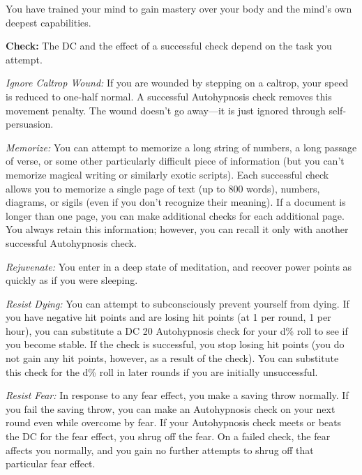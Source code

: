 You have trained your mind to gain mastery over your body and the mind's own deepest capabilities.

\textbf{Check:} The DC and the effect of a successful check depend on the task you attempt.


\textit{Ignore Caltrop Wound:} If you are wounded by stepping on a caltrop, your speed is reduced to one-half normal. A successful Autohypnosis check removes this movement penalty. The wound doesn't go away---it is just ignored through self-persuasion.

\textit{Memorize:} You can attempt to memorize a long string of numbers, a long passage of verse, or some other particularly difficult piece of information (but you can't memorize magical writing or similarly exotic scripts). Each successful check allows you to memorize a single page of text (up to 800 words), numbers, diagrams, or sigils (even if you don't recognize their meaning). If a document is longer than one page, you can make additional checks for each additional page. You always retain this information; however, you can recall it only with another successful Autohypnosis check.

\textit{Rejuvenate:} You enter in a deep state of meditation, and recover power points as quickly as if you were sleeping.

\textit{Resist Dying:} You can attempt to subconsciously prevent yourself from dying. If you have negative hit points and are losing hit points (at 1 per round, 1 per hour), you can substitute a DC 20 Autohypnosis check for your d\% roll to see if you become stable. If the check is successful, you stop losing hit points (you do not gain any hit points, however, as a result of the check). You can substitute this check for the d\% roll in later rounds if you are initially unsuccessful.

\textit{Resist Fear:} In response to any fear effect, you make a saving throw normally. If you fail the saving throw, you can make an Autohypnosis check on your next round even while overcome by fear. If your Autohypnosis check meets or beats the DC for the fear effect, you shrug off the fear. On a failed check, the fear affects you normally, and you gain no further attempts to shrug off that particular fear effect.

